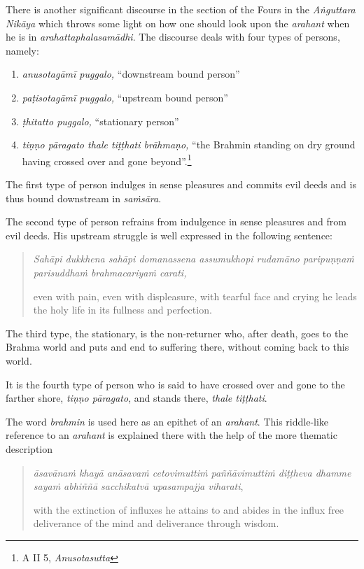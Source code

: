 There is another significant discourse in the section of the Fours in the \emph{Aṅguttara Nikāya} which throws some light on how one should look upon the \emph{arahant} when he is in \emph{arahattaphalasamādhi}. The discourse deals with four types of persons, namely:

\begin{enumerate}
\def\labelenumi{\arabic{enumi}.}
\tightlist
\item
  \emph{anusotagāmī puggalo,} ``downstream bound person''
\item
  \emph{paṭisotagāmī puggalo,} ``upstream bound person''
\item
  \emph{ṭhitatto puggalo,} ``stationary person''
\item
  \emph{tiṇṇo pāragato thale tiṭṭhati brāhmaṇo,} ``the Brahmin standing on dry ground having crossed over and gone beyond''.\footnote{A II 5, \emph{Anusotasutta}}
\end{enumerate}

The first type of person indulges in sense pleasures and commits evil deeds and is thus bound downstream in \emph{saṁsāra}.

The second type of person refrains from indulgence in sense pleasures and from evil deeds. His upstream struggle is well expressed in the following sentence:

\begin{quote}
\emph{Sahāpi dukkhena sahāpi domanassena assumukhopi rudamāno paripuṇṇaṁ parisuddhaṁ brahmacariyaṁ carati,}

even with pain, even with displeasure, with tearful face and crying he leads the holy life in its fullness and perfection.
\end{quote}

The third type, the stationary, is the non-returner who, after death, goes to the Brahma world and puts and end to suffering there, without coming back to this world.

It is the fourth type of person who is said to have crossed over and gone to the farther shore, \emph{tiṇṇo pāragato}, and stands there, \emph{thale tiṭṭhati}.

The word \emph{brahmin} is used here as an epithet of an \emph{arahant}. This riddle-like reference to an \emph{arahant} is explained there with the help of the more thematic description

\begin{quote}
\emph{āsavānaṁ khayā anāsavaṁ cetovimuttiṁ paññāvimuttiṁ diṭṭheva dhamme sayaṁ abhiññā sacchikatvā upasampajja viharati},

with the extinction of influxes he attains to and abides in the influx free deliverance of the mind and deliverance through wisdom.
\end{quote}

